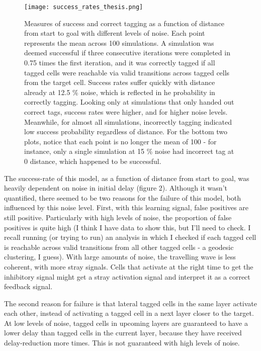 \documentclass{article}
\begin{document}
\begin{figure}[H]
    \texttt{[image: success\_rates\_thesis.png]}
    \caption{Measures of success and correct tagging as a function of distance from start to goal with different levels of noise. Each point represents the mean across 100 simulations. A simulation was deemed successful if three consecutive iterations were completed in 0.75 times the first iteration, and it was correctly tagged if all tagged cells were reachable via valid transitions across tagged cells from the target cell. Success rates suffer quickly with distance already at 12.5 \% noise, which is reflected in he probability in correctly tagging. Looking only at simulations that only handed out correct tags, success rates were higher, and for higher noise levels. Meanwhile, for almost all simulations, incorrectly tagging indicated low success probability regardless of distance. For the bottom two plots, notice that each point is no longer the mean of 100 - for instance, only a single simulation at 15 \% noise had incorrect tag at 0 distance, which happened to be successful.}
\end{figure}

The success-rate of this model, as a function of distance from start to goal, was heavily dependent on noise in initial delay (figure 2). Although it wasn't quantified, there seemed to be two reasons for the failure of this model, both influenced by this noise level. First, with this learning signal, false positives are still positive. Particularly with high levels of noise, the proportion of false positives is quite high (I think I have data to show this, but I'll need to check. I recall running (or trying to run) an analysis in which I checked if each tagged cell is reachable across valid transitions from all other tagged cells - a geodesic clustering, I guess). With large amounts of noise, the travelling wave is less coherent, with more stray signals. Cells that activate at the right time to get the inhibitory signal might get a stray activation signal and interpret it as a correct feedback signal.

The second reason for failure is that lateral tagged cells in the same layer activate each other, instead of activating a tagged cell in a next layer closer to the target. At low levels of noise, tagged cells in upcoming layers are guaranteed to have a lower delay than tagged cells in the current  layer, because they have received delay-reduction more times. This is not guaranteed with high levels of noise.
\end{document}
